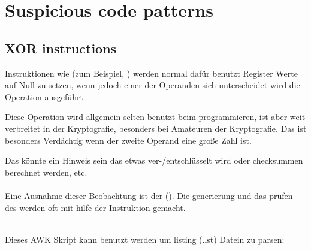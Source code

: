 \section{Suspicious code patterns}

\subsection{XOR instructions}

Instruktionen wie  (zum Beispiel, )
werden normal dafür benutzt Register Werte auf Null zu setzen, wenn jedoch
einer der Operanden sich unterscheidet wird die  Operation 
ausgeführt.


Diese Operation wird allgemein selten benutzt beim programmieren, ist aber 
weit verbreitet in der Kryptografie, besonders bei Amateuren der Kryptografie. %
Das ist besonders Verdächtig wenn der zweite Operand eine große Zahl ist.


Das könnte ein Hinweis sein das etwas ver-/entschlüsselt wird oder checksummen berechnet werden, etc.\\
\\


Eine Ausnahme dieser Beobachtung ist der  (). 
Die generierung und das prüfen des  werden oft mit hilfe der \XOR Instruktion gemacht. \\
\\



Dieses AWK Skript kann benutzt werden um \IDA{} listing (.lst) Datein zu parsen:

